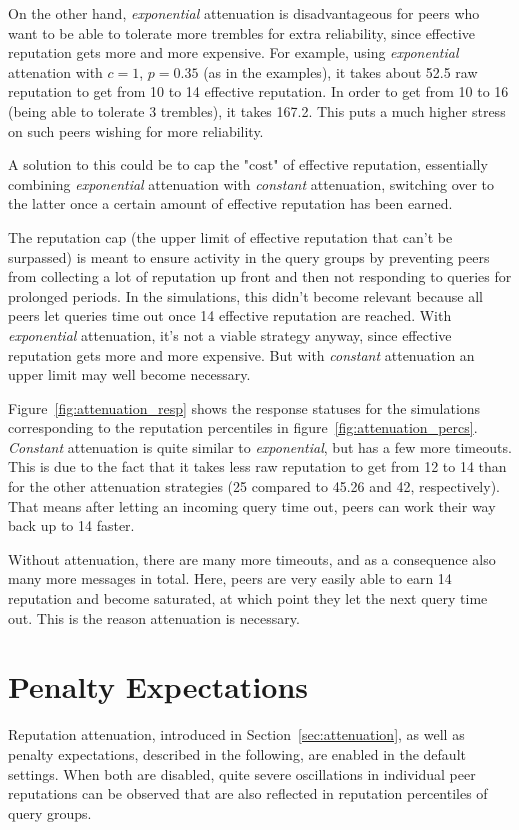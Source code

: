 On the other hand, \emph{exponential} attenuation is disadvantageous for peers
who want to be able to tolerate more trembles for extra reliability, since
effective reputation gets more and more expensive. For example, using
\emph{exponential} attenation with $c = 1$, $p = 0.35$ (as in the examples), it
takes about 52.5 raw reputation to get from 10 to 14 effective reputation. In
order to get from 10 to 16 (being able to tolerate 3 trembles), it takes 167.2.
This puts a much higher stress on such peers wishing for more reliability.

A solution to this could be to cap the "cost" of effective reputation,
essentially combining \emph{exponential} attenuation with \emph{constant}
attenuation, switching over to the latter once a certain amount of effective
reputation has been earned.

The reputation cap (the upper limit of effective reputation that can't be
surpassed) is meant to ensure activity in the query groups by preventing peers
from collecting a lot of reputation up front and then not responding to queries
for prolonged periods. In the simulations, this didn't become relevant because
all peers let queries time out once 14 effective reputation are reached. With
\emph{exponential} attenuation, it's not a viable strategy anyway, since
effective reputation gets more and more expensive. But with \emph{constant}
attenuation an upper limit may well become necessary.

Figure~\ref{fig:attenuation_resp} shows the response statuses for the
simulations corresponding to the reputation percentiles in
figure~\ref{fig:attenuation_percs}. \emph{Constant} attenuation is quite similar
to \emph{exponential}, but has a few more timeouts. This is due to the fact that
it takes less raw reputation to get from 12 to 14 than for the other attenuation
strategies (25 compared to 45.26 and 42, respectively). That means after letting
an incoming query time out, peers can work their way back up to 14 faster.

Without attenuation, there are many more timeouts, and as a consequence also
many more messages in total. Here, peers are very easily able to earn 14
reputation and become saturated, at which point they let the next query time
out. This is the reason attenuation is necessary.

\section{Penalty Expectations}
\label{sec:penalty_expectations}
Reputation attenuation, introduced in Section~\ref{sec:attenuation}, as well as
penalty expectations, described in the following, are enabled in the default
settings. When both are disabled, quite severe oscillations in individual peer
reputations can be observed that are also reflected in reputation percentiles of
query groups.

